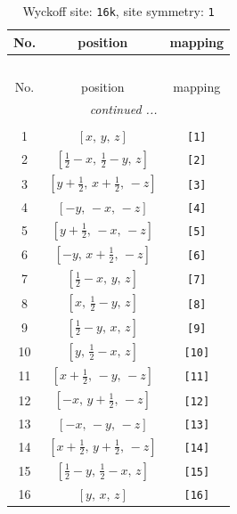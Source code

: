 \documentclass[fleqn,8pt]{jsarticle}
\begin{document}
\begin{longtable}{ccc}
\caption{Wyckoff site: {\tt 16k}, site symmetry: {\tt 1}}
 \\
 \hline \hline
No. & position & mapping \\ \hline \endfirsthead

\multicolumn{2}{l}{\tablename\ \thetable{}} \\
 \hline \hline
No. & position & mapping \\ \hline \endhead

 \hline \hline
\multicolumn{2}{r}{\footnotesize\it continued ...} \\ \endfoot

 \hline \hline
\multicolumn{2}{r}{} \\ \endlastfoot

1 & $\left[ x,\, y,\, z \right]$ & {\tt [1]} \\ \hline
2 & $\left[ \frac{1}{2} - x,\, \frac{1}{2} - y,\, z \right]$ & {\tt [2]} \\ \hline
3 & $\left[ y + \frac{1}{2},\, x + \frac{1}{2},\, - z \right]$ & {\tt [3]} \\ \hline
4 & $\left[ - y,\, - x,\, - z \right]$ & {\tt [4]} \\ \hline
5 & $\left[ y + \frac{1}{2},\, - x,\, - z \right]$ & {\tt [5]} \\ \hline
6 & $\left[ - y,\, x + \frac{1}{2},\, - z \right]$ & {\tt [6]} \\ \hline
7 & $\left[ \frac{1}{2} - x,\, y,\, z \right]$ & {\tt [7]} \\ \hline
8 & $\left[ x,\, \frac{1}{2} - y,\, z \right]$ & {\tt [8]} \\ \hline
9 & $\left[ \frac{1}{2} - y,\, x,\, z \right]$ & {\tt [9]} \\ \hline
10 & $\left[ y,\, \frac{1}{2} - x,\, z \right]$ & {\tt [10]} \\ \hline
11 & $\left[ x + \frac{1}{2},\, - y,\, - z \right]$ & {\tt [11]} \\ \hline
12 & $\left[ - x,\, y + \frac{1}{2},\, - z \right]$ & {\tt [12]} \\ \hline
13 & $\left[ - x,\, - y,\, - z \right]$ & {\tt [13]} \\ \hline
14 & $\left[ x + \frac{1}{2},\, y + \frac{1}{2},\, - z \right]$ & {\tt [14]} \\ \hline
15 & $\left[ \frac{1}{2} - y,\, \frac{1}{2} - x,\, z \right]$ & {\tt [15]} \\ \hline
16 & $\left[ y,\, x,\, z \right]$ & {\tt [16]} \\
\end{longtable}
\end{document}
